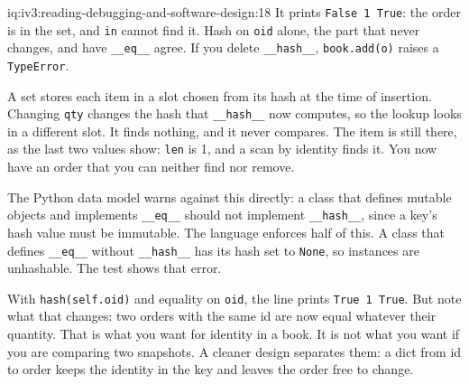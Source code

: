 \begin{solution}{iq:iv3:reading-debugging-and-software-design:18}
It prints \texttt{False 1 True}: the order is in the set, and \texttt{in} cannot find it. Hash on \texttt{oid} alone, the part that never changes, and have \texttt{\_\_eq\_\_} agree. If you delete \texttt{\_\_hash\_\_}, \texttt{book.add(o)} raises a \texttt{TypeError}.

A set stores each item in a slot chosen from its hash at the time of insertion. Changing \texttt{qty} changes the hash that \texttt{\_\_hash\_\_} now computes, so the lookup looks in a different slot. It finds nothing, and it never compares. The item is still there, as the last two values show: \texttt{len} is 1, and a scan by identity finds it. You now have an order that you can neither find nor remove.

The Python data model warns against this directly: a class that defines mutable objects and implements \texttt{\_\_eq\_\_} should not implement \texttt{\_\_hash\_\_}, since a key's hash value must be immutable. The language enforces half of this. A class that defines \texttt{\_\_eq\_\_} without \texttt{\_\_hash\_\_} has its hash set to \texttt{None}, so instances are unhashable. The test shows that error.

With \texttt{hash(self.oid)} and equality on \texttt{oid}, the line prints \texttt{True 1 True}. But note what that changes: two orders with the same id are now equal whatever their quantity. That is what you want for identity in a book. It is not what you want if you are comparing two snapshots. A cleaner design separates them: a dict from id to order keeps the identity in the key and leaves the order free to change.


\end{solution}

